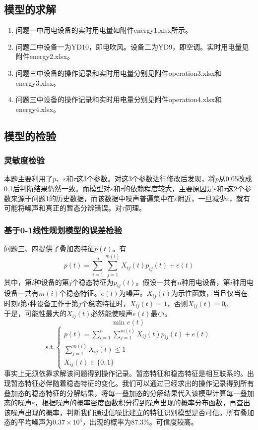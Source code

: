 \documentclass[UTF8]{article}
\begin{document}
\subsection{模型的求解}
\begin{enumerate}[1]
\item 问题一中用电设备的实时用电量如附件energy1.xlsx所示。
\item 问题二中设备一为YD10，即电吹风。设备二为YD9，即空调。实时用电量见附件energy2.xlsx。
\item 问题三中设备的操作记录和实时用电量分别见附件operation3.xlsx和energy3.xlsx。
\item 问题三中设备的操作记录和实时用电量分别见附件operation4.xlsx和energy4.xlsx。
\end{enumerate}

\subsection{模型的检验}
\subsubsection{灵敏度检验}
\indent 本题主要利用了\(p\)、\(\varepsilon\)和\(\tau\)这3个参数。对这3个参数进行修改后发现，将\(p\)从0.05改成0.1后判断结果仍然一致。而模型对\(\varepsilon\)和\(\tau\)的依赖程度较大，主要原因是\(\varepsilon\)和\(\tau\)这2个参数来源于问题1的历史数据，而该数据中噪声普遍集中在\(\varepsilon\)附近，一旦减少\(\varepsilon\)，就有可能将噪声和真正的暂态分辨错误。对\(\tau\)同理。

\subsubsection{基于0-1线性规划模型的误差检验}
\indent 问题三、四提供了叠加态特征\(p(t)\)。有
\[p(t)=\sum\limits_{i=1}^{n}\sum\limits_{j=1}^{m(i)}X_{ij}(t)p_{ij}(t)+e(t)\]
\indent 其中，第\(i\)种设备的第\(j\)个稳态特征为\(p_{ij}(t)\)。假设一共有\(n\)种用电设备，第\(i\)种用电设备一共有\(m(i)\)个稳态特征。\(e(t)\)为噪声。\(X_{ij}(t)\)为示性函数，当且仅当在时刻\(t\)第\(i\)种设备工作于第\(j\)个稳态特征时，\(X_{ij}(t)=1\)，否则\(X_{ij}(t)=0\)。\\
\indent 于是，可能性最大的\(X_{ij}(t)\)必然能使噪声\(e(t)\)最小。
\[\textrm{min }e(t)\]
\[\textrm{s.t.}\left\{
\begin{array}{l}
p(t)=\sum\limits_{i=1}^{n}\sum\limits_{j=1}^{m(i)}X_{ij}(t)p_{ij}(t)+e(t)\\
\sum\limits_{j=1}^{m(i)}X_{ij}(t)\leqslant1\\
X_{ij}(t)\in\{0,1\}
\end{array}\right. \]
\indent 事实上无须依靠求解该问题得到操作记录。暂态特征和稳态特征是相互联系的。出现暂态特征必伴随着稳态特征的变化。我们可以通过已经求出的操作记录得到所有叠加态的稳态特征的分解结果，将每一叠加态的分解结果代入该模型计算每一叠加态的噪声\(\varepsilon\)，根据噪声的概率密度函数积分得到噪声出现的概率分布函数，再查出该噪声出现的概率，判断我们通过信噪比建立的特征识别模型是否可信。所有叠加态的平均噪声为\(0.37\times10^4\)，出现的概率为87.3\%。可信度较高。
\end{document}
